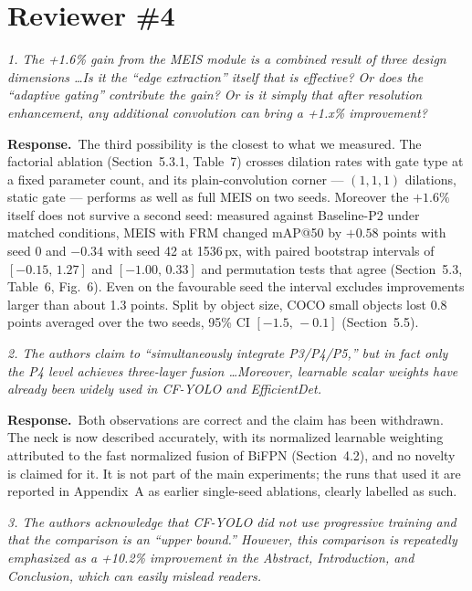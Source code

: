 \documentclass[11pt, a4paper]{article}
\newcommand{\point}[1]{\medskip\noindent\textit{#1}\par}
\newcommand{\reply}{\textbf{Response.}\ }
\begin{document}
\section*{Reviewer \#4}

\point{1. The +1.6\% gain from the MEIS module is a combined result of three
design dimensions \dots Is it the ``edge extraction'' itself that is effective? Or
does the ``adaptive gating'' contribute the gain? Or is it simply that after
resolution enhancement, any additional convolution can bring a +1.x\%
improvement?}

\reply The third possibility is the closest to what we measured. The factorial
ablation (Section~5.3.1, Table~7) crosses dilation rates with gate type at a fixed
parameter count, and its plain-convolution corner --- $(1,1,1)$ dilations, static
gate --- performs as well as full MEIS on two seeds. Moreover the $+1.6\%$ itself
does not survive a second seed: measured against Baseline-P2 under matched
conditions, MEIS with FRM changed mAP@50 by $+0.58$ points with seed 0 and
$-0.34$ with seed 42 at 1536\,px, with paired bootstrap intervals of
$[-0.15,\,1.27]$ and $[-1.00,\,0.33]$ and permutation tests that agree
(Section~5.3, Table~6, Fig.~6). Even on the favourable seed the interval excludes
improvements larger than about 1.3 points. Split by object size, COCO small
objects lost 0.8 points averaged over the two seeds, 95\% CI $[-1.5,\,-0.1]$
(Section~5.5).

\point{2. The authors claim to ``simultaneously integrate P3/P4/P5,'' but in fact
only the P4 level achieves three-layer fusion \dots Moreover, learnable scalar
weights have already been widely used in CF-YOLO and EfficientDet.}

\reply Both observations are correct and the claim has been withdrawn. The neck is
now described accurately, with its normalized learnable weighting attributed to
the fast normalized fusion of BiFPN (Section~4.2), and no novelty is claimed for
it. It is not part of the main experiments; the runs that used it are reported in
Appendix~A as earlier single-seed ablations, clearly labelled as such.

\point{3. The authors acknowledge that CF-YOLO did not use progressive training
and that the comparison is an ``upper bound.'' However, this comparison is
repeatedly emphasized as a +10.2\% improvement in the Abstract, Introduction, and
Conclusion, which can easily mislead readers.}
\end{document}
